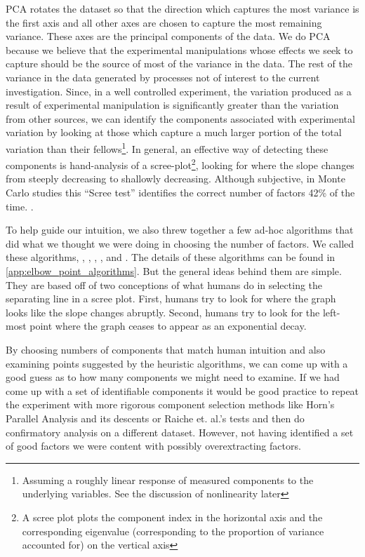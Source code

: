 \documentclass[eric_thesis.tex]{subfiles}
\begin{document}
PCA rotates the dataset so that the direction which captures the most variance 
is the first axis and all other axes are chosen to capture the most remaining 
variance. These axes are the principal components of the data. We do PCA because 
we believe that the experimental manipulations whose effects we seek to capture 
should be the source of most of the variance in the data. The rest of the 
variance in the data generated by processes not of interest to the current 
investigation. Since, in a well controlled experiment, the variation produced as 
a result of experimental manipulation is significantly greater than the 
variation from other sources, we can identify the components associated with 
experimental variation by looking at those which capture a much larger portion 
of the total variation than their fellows\footnote{Assuming a roughly linear 
response of measured components to the underlying variables. See the discussion 
of nonlinearity later}. In general, an effective way of detecting these 
components is hand-analysis of a scree-plot\footnote{A scree plot plots the 
component index in the horizontal axis and the corresponding eigenvalue 
(corresponding to the proportion of variance accounted for) on the vertical 
axis}, looking for where the slope changes from steeply decreasing to shallowly 
decreasing. Although subjective, in Monte Carlo studies this ``Scree test'' 
identifies the correct number of factors 42\% of the time. . 

To help guide our intuition, we also threw together a few ad-hoc algorithms that 
did what we thought we were doing in choosing the number of factors. We called 
these algorithms, , , 
, , and 
. The details of these algorithms can 
be found in \ref{app:elbow_point_algorithms}. But the general ideas behind them 
are simple. They are based off of two conceptions of what humans do in selecting 
the separating line in a scree plot. First, humans try to look for where the 
graph looks like the slope changes abruptly. Second, humans try to look for the 
left-most point where the graph ceases to appear as an exponential decay.

By choosing numbers of components that match human intuition and also examining 
points suggested by the heuristic algorithms, we can come up with a good guess 
as to how many components we might need to examine. If we had come up with a set 
of identifiable components it would be good practice to repeat the experiment 
with more rigorous component selection methods like Horn's Parallel Analysis and 
its descents  or Raiche et. al.'s 
tests  and then do confirmatory analysis on 
a different dataset. However, not having identified a set of good factors we 
were content with possibly overextracting factors.
\end{document}
